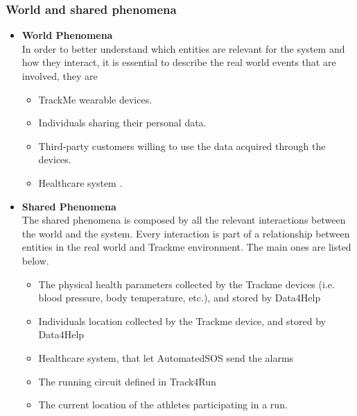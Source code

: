 \documentclass[12pt]{article}
\begin{document}
\subsubsection{World and shared phenomena}
\begin{itemize}
\item \textbf{World Phenomena}
\\
In order to better understand which entities are relevant for the system and how they interact, it is essential to describe the real world events that are involved, they are
\begin{itemize}
\item{} TrackMe wearable devices.
\item{} Individuals sharing their personal data.
\item{} Third-party customers willing to use the data acquired through the devices.
\item{} Healthcare system .
\end{itemize}

\item \textbf{Shared Phenomena}
\\
The shared phenomena is composed by all the relevant interactions between the world and the system. Every interaction is part of a relationship between entities in the real world and Trackme environment. The main ones are listed below.
\begin{itemize}
\item{} The physical health parameters collected by the Trackme devices (i.e. blood pressure, body temperature, etc.), and stored by Data4Help
\item{} Individuals location collected by the Trackme device, and stored by Data4Help
\item{} Healthcare system, that let AutomatedSOS send the alarms
\item{} The running circuit defined in Track4Run
\item{} The current location of the athletes participating in a run.
\end{itemize}
\end{itemize}
\end{document}
